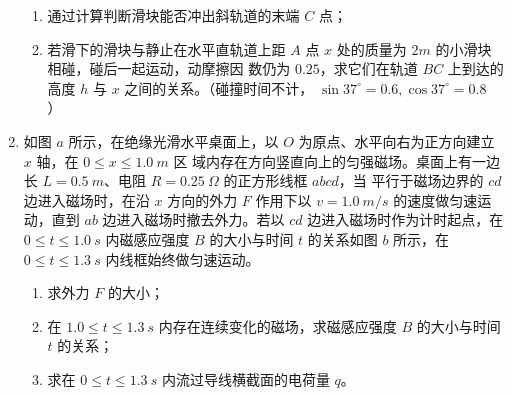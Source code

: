 \begin{enumerate}
\begin{enumerate}
\item 
通过计算判断滑块能否冲出斜轨道的末端 $ C $ 点；



\item 
若滑下的滑块与静止在水平直轨道上距 $ A $ 点 $ x $ 处的质量为 $ 2m $ 的小滑块相碰，碰后一起运动，动摩擦因
数仍为 $ 0.25 $，求它们在轨道 $ BC $ 上到达的高度 $ h $ 与 $ x $ 之间的关系。（碰撞时间不计， $ \sin 37 ^{ \circ } =0.6 ,\cos 37 ^{ \circ } =0.8 $ ）
\end{enumerate}
\begin{figure}[h!]
\flushright

\end{figure}



\newpage
\item
如图 $ a $ 所示，在绝缘光滑水平桌面上，以 $ O $ 为原点、水平向右为正方向建立 $ x $ 轴，在 $ 0 \leq x \leq 1.0 \ m $ 区
域内存在方向竖直向上的匀强磁场。桌面上有一边长 $ L=0.5 \ m $、电阻 $ R=0.25 \ \Omega $ 的正方形线框 $ abcd $，当
平行于磁场边界的 $ cd $ 边进入磁场时，在沿 $ x $ 方向的外力 $ F $ 作用下以 $ v=1.0 \ m/s $ 的速度做匀速运动，直到 $ ab $
边进入磁场时撤去外力。若以 $ cd $ 边进入磁场时作为计时起点，在 $ 0 \leq t \leq 1.0 \ s $ 内磁感应强度 $ B $ 的大小与时间
$ t $ 的关系如图 $ b $ 所示，在 $ 0 \leq t \leq 1.3 \ s $ 内线框始终做匀速运动。
\begin{enumerate}
\item
求外力 $ F $ 的大小；



\item 
在 $ 1.0 \leq t \leq 1.3 \ s $ 内存在连续变化的磁场，求磁感应强度 $ B $ 的大小与时间 $ t $ 的关系；



\item 
求在 $ 0 \leq t \leq 1.3 \ s $ 内流过导线横截面的电荷量 $ q $。
\end{enumerate}
\begin{figure}[h!]
\flushright
\begin{subfigure}{0.44\linewidth}
\centering
 
\caption{}\label{}
\end{subfigure}
\hfil
\begin{subfigure}{0.5\linewidth}
\centering
 
\caption{}\label{}
\end{subfigure}
\end{figure}



\end{enumerate}
